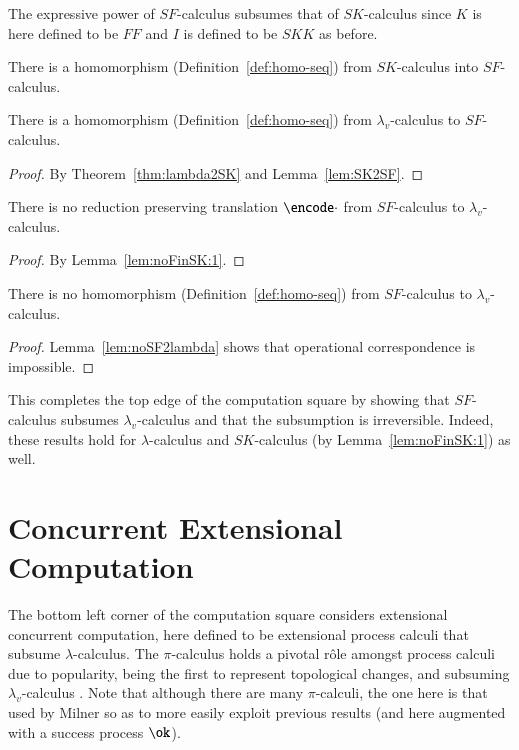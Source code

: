 \documentclass{llncs}
\begin{document}
The expressive power of $SF$-calculus subsumes that of $SK$-calculus
since $K$ is here defined to be $FF$ and $I$ is defined to be $SKK$
as before.

\begin{lemma}
\label{lem:SK2SF}
There is a homomorphism (Definition~\ref{def:homo-seq}) from $SK$-calculus into $SF$-calculus.
\end{lemma}

\begin{theorem}
\label{thm:lambdav2SF}
There is a homomorphism (Definition~\ref{def:homo-seq}) from $\lambda_v$-calculus to $SF$-calculus.
\end{theorem}
\begin{proof}
By Theorem~\ref{thm:lambda2SK} and Lemma~\ref{lem:SK2SF}.
\end{proof}


\begin{lemma}
\label{lem:noSF2lambda}
There is no reduction preserving translation $\encode\cdot$ from $SF$-calculus to $\lambda_v$-calculus.
\end{lemma}
\begin{proof}
By Lemma~\ref{lem:noFinSK:1}.
\end{proof}

\begin{theorem}
\label{thm:noSF2lambda}
There is no homomorphism (Definition~\ref{def:homo-seq}) from $SF$-calculus to $\lambda_v$-calculus.
\end{theorem}
\begin{proof}
Lemma~\ref{lem:noSF2lambda} shows that operational correspondence is impossible.
\end{proof}

This completes the top edge of the computation square by showing that
$SF$-calculus subsumes $\lambda_v$-calculus and that the subsumption is
irreversible.
Indeed, these results hold for $\lambda$-calculus \cite[Theorem~5.2.6]{GivenWilsonPHD} and
$SK$-calculus (by Lemma~\ref{lem:noFinSK:1}) as well.




\section{Concurrent Extensional Computation}
\label{sec:cec}

The bottom left corner of the computation square considers extensional concurrent computation,
here defined to be extensional process calculi that subsume $\lambda$-calculus.
The $\pi$-calculus \cite{milner.parrow.ea:calculus-mobile} holds a pivotal r\^ole amongst process
calculi due to popularity, being the first to represent topological changes, and subsuming
$\lambda_v$-calculus \cite{90426}.
Note that although there are many $\pi$-calculi, the one here is that used by Milner so as to 
more easily exploit previous results \cite{90426} (and here augmented with a success process $\ok$).
\end{document}
